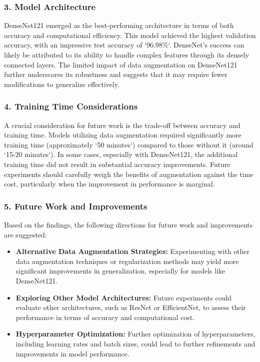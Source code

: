 \subsubsection{3. Model Architecture}

DenseNet121 emerged as the best-performing architecture in terms of both accuracy and computational efficiency. This model achieved the highest validation accuracy, with an impressive test accuracy of `96.98\%`. DenseNet's success can likely be attributed to its ability to handle complex features through its densely connected layers. The limited impact of data augmentation on DenseNet121 further underscores its robustness and suggests that it may require fewer modifications to generalize effectively.

\subsubsection{4. Training Time Considerations}

A crucial consideration for future work is the trade-off between accuracy and training time. Models utilizing data augmentation required significantly more training time (approximately `50 minutes`) compared to those without it (around `15-20 minutes`). In some cases, especially with DenseNet121, the additional training time did not result in substantial accuracy improvements. Future experiments should carefully weigh the benefits of augmentation against the time cost, particularly when the improvement in performance is marginal.

\subsubsection{5. Future Work and Improvements}

Based on the findings, the following directions for future work and improvements are suggested:

\begin{itemize}
    \item \textbf{Alternative Data Augmentation Strategies:} Experimenting with other data augmentation techniques or regularization methods may yield more significant improvements in generalization, especially for models like DenseNet121.
    \item \textbf{Exploring Other Model Architectures:} Future experiments could evaluate other architectures, such as ResNet or EfficientNet, to assess their performance in terms of accuracy and computational cost.
    \item \textbf{Hyperparameter Optimization:} Further optimization of hyperparameters, including learning rates and batch sizes, could lead to further refinements and improvements in model performance.
\end{itemize}

